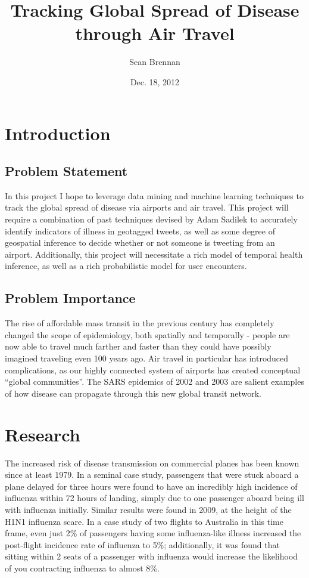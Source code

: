 \documentclass[11pt, letterpaper]{article}
\title{Tracking Global Spread of Disease through Air Travel}
\author{Sean Brennan}
\date{Dec. 18, 2012}
\begin{document}
    \maketitle

    \section{Introduction}
        \subsection{Problem Statement}
            In this project I hope to leverage data mining and machine learning techniques to track the global spread of disease via airports and air travel. This project will require a combination of past techniques devised by Adam Sadilek to accurately identify indicators of illness in geotagged tweets, as well as some degree of geospatial inference to decide whether or not someone is tweeting from an airport. Additionally, this project will necessitate a rich model of temporal health inference, as well as a rich probabilistic model for user encounters.

        \subsection{Problem Importance}
            The rise of affordable mass transit in the previous century has completely changed the scope of epidemiology, both spatially and temporally - people are now able to travel much farther and faster than they could have possibly imagined traveling even 100 years ago. Air travel in particular has introduced complications, as our highly connected system of airports has created conceptual ``global communities''. The SARS epidemics of 2002 and 2003 are salient examples of how disease can propagate through this new global transit network.

    \section{Research}
        The increased risk of disease transmission on commercial planes has been known since at least 1979. In a seminal case study, passengers that were stuck aboard a plane delayed for three hours were found to have an incredibly high incidence of influenza within 72 hours of landing, simply due to one passenger aboard being ill with influenza initially. \cite{moser} Similar results were found in 2009, at the height of the H1N1 influenza scare. In a case study of two flights to Australia in this time frame, even just 2\% of passengers having some influenza-like illness increased the post-flight incidence rate of influenza to 5\%; additionally, it was found that sitting within 2 seats of a passenger with influenza would increase the likelihood of you contracting influenza to almost 8\%. \cite{foxwell}
\end{document}
